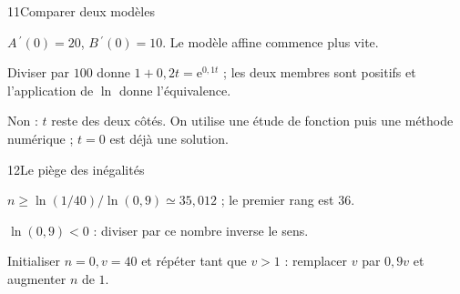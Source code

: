 \begin{corrige}{11}{Comparer deux modèles}
\begin{questions}
\item $A\,\!^{\prime}(0)=20$, $B\,\!^{\prime}(0)=10$. Le modèle affine commence plus vite.
\item Diviser par $100$ donne $1+0{,}2t=\mathrm e^{0{,}1t}$ ; les deux membres sont positifs et l’application de $\ln$ donne l’équivalence.
\item Non : $t$ reste des deux côtés. On utilise une étude de fonction puis une méthode numérique ; $t=0$ est déjà une solution.
\end{questions}
\end{corrige}
\begin{corrige}{12}{Le piège des inégalités}
\begin{questions}
\item $n\geq\ln(1/40)/\ln(0{,}9)\simeq35{,}012$ ; le premier rang est $36$.
\item $\ln(0{,}9)<0$ : diviser par ce nombre inverse le sens.
\item Initialiser $n=0,v=40$ et répéter tant que $v>1$ : remplacer $v$ par $0{,}9v$ et augmenter $n$ de $1$.
\end{questions}
\end{corrige}
